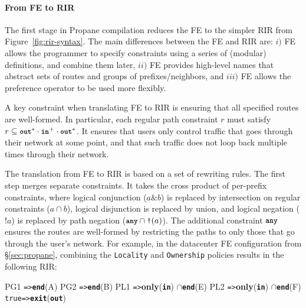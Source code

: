 \documentclass[10pt]{sigalternate052015}
\newcommand{\sysname}{{\small \sf Propane}\xspace}
\newcommand{\para}[1]{\paragraph*{\textbf{#1}}}
\newcommand{\CD}[1]{\texttt{\small #1}}  %
\newcommand{\KW}[1]{\texttt{\small\bfseries{#1}}}
\newcommand{\True}{\CD{true}}
\newcommand{\Path}{\texttt{=>}}
\newcommand{\Any}{\KW{any}}
\newcommand{\In}{\KW{in}}
\newcommand{\Out}{\KW{out}}
\newcommand{\AND}{\texttt{\&}}
\newcommand{\NOT}{\texttt{!}}
\newcommand{\Intersect}{\ensuremath{\cap}}
\newcommand{\Exit}{\KW{exit}}
\newcommand{\End}{\KW{end}}
\renewcommand{\path}[2]{ #1 \mapsto \ensuremath{#2} }
\begin{document}
\para{From FE to RIR}

The first stage in \sysname compilation reduces the FE to the simpler RIR from Figure~\ref{fig:rir-syntax}.
The main differences between the FE and RIR are: $i)$ FE allows the programmer to specify constraints using a series of (modular) definitions, and combine them later, $ii)$ FE provides high-level names that abstract sets of routes and groups of prefixes/neighbors, and $iii)$ FE allows the preference operator to be used more flexibly.

A key constraint when translating FE to RIR is ensuring that all specified routes are well-formed. In particular, each regular path constraint $r$ must satisfy $r \subseteq \Out^* \cdot \In^+ \cdot \Out^*$. It ensures that users only control traffic that goes through their network at some point, and that such traffic does not loop back multiple times through their network.

The translation from FE to RIR is based on a set of rewriting rules.
The first step merges separate constraints. It takes the cross product of per-prefix constraints, where logical conjunction ($a \AND b$) is replaced by intersection on regular constraints ($a \Intersect b$), logical disjunction is replaced by union, and logical negation ($\NOT a$) is replaced by path negation ($\Any \cap \NOT(a)$). The additional constraint $\Any$ ensures the routes are well-formed by restricting the paths to only those that go through the user's network.
%
For example, in the datacenter FE configuration from \S\ref{sec:propane}, combining the \CD{Locality} and \CD{Ownership} policies results in the following RIR:


\begin{code}
PG1 \Path \End(A)
PG2 \Path \End(B)
PL1 \Path \textbf{only}(\In) \Intersect \End(E)
PL2 \Path \textbf{only}(\In) \Intersect \End(F)
\True \Path \Exit(\Out)
\end{code}
\end{document}
